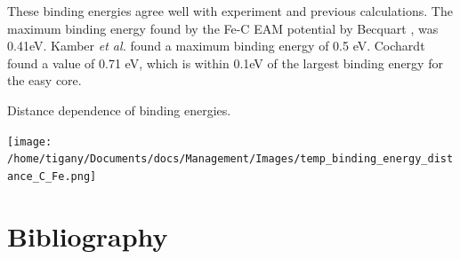 \documentclass[a4paper]{article}
\begin{document}
These binding energies agree well with experiment and previous
calculations. The maximum binding energy found by the Fe-C EAM
potential by Becquart \cite{Becquart2007}, was 0.41eV. Kamber
\emph{et al.} found a maximum binding energy of 0.5 eV. Cochardt
found a value of 0.71 eV, which is within 0.1eV of the largest
binding energy for the easy core. 


Distance dependence of binding energies. 

\begin{center}
\texttt{[image: /home/tigany/Documents/docs/Management/Images/temp\_binding\_energy\_distance\_C\_Fe.png]}
\end{center}

\section{Bibliography}
\label{sec:org03cc71a}
\label{orgd01439b}



\end{document}
